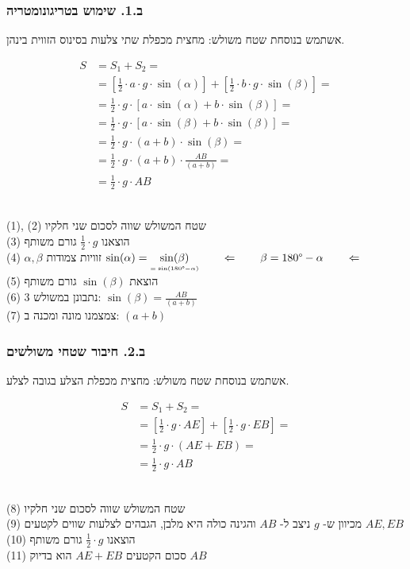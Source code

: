 \subsubsection*{ב.1. שימוש בטריגונומטריה}
אשתמש בנוסחת שטח משולש: מחצית מכפלת שתי צלעות בסינוס הזווית בינהן.
\\[-10pt]
\hspace*{90pt}
\parbox[t][130pt][t]{370pt}{
\begin{align}
S &= S_1 + S_2 = \\
&= [ \tfrac{1}{2} \cdot a \cdot g \cdot \sin(\alpha) ] + [ \tfrac{1}{2} \cdot b \cdot g \cdot \sin(\beta) ] = \\
&= \tfrac{1}{2} \cdot g \cdot [ a \cdot \sin(\alpha) + b \cdot \sin(\beta) ] = \\
&= \tfrac{1}{2} \cdot g \cdot [ a \cdot \sin(\beta) + b \cdot \sin(\beta) ] = \\
&= \tfrac{1}{2} \cdot g \cdot ( a + b ) \cdot \sin(\beta) = \\
&= \tfrac{1}{2} \cdot g \cdot ( a + b ) \cdot \tfrac{AB}{(a + b)} = \\
&= \tfrac{1}{2} \cdot g \cdot AB
\end{align}
}
\\[10pt]
(1), (2) שטח המשולש שווה לסכום שני חלקיו \\
(3) הוצאנו $\tfrac{1}{2} \cdot g$ גורם משותף \\
(4) $\alpha, \beta$ זוויות צמודות
$ \sin(\alpha) = \underset{\scriptscriptstyle{= \; \sin(180\degree - \alpha)}}{\sin(\beta)} \qquad \Leftarrow \qquad \beta = 180\degree - \alpha \qquad \Leftarrow \qquad $\\[-7pt]
(5) הוצאת $\sin(\beta)$ גורם משותף\\[2pt]
(6) נתבונן במשולש 3: $\sin(\beta) = \tfrac{AB}{(a + b)}$\\[2pt]
(7) צמצמנו מונה ומכנה ב: $(a + b)$
 
\subsubsection*{ב.2. חיבור שטחי משולשים}
אשתמש בנוסחת שטח משולש: מחצית מכפלת הצלע בגובה לצלע.
\\[-10pt]
\hspace*{100pt}
\parbox[t][80pt][t]{350pt}{
\begin{align}
S &= S_1 + S_2 = \\
&= [ \tfrac{1}{2} \cdot g \cdot AE ] + [ \tfrac{1}{2} \cdot g \cdot EB ] = \\
&= \tfrac{1}{2} \cdot g \cdot (AE + EB) = \\
&= \tfrac{1}{2} \cdot g \cdot AB
\end{align}
}
\\[10pt]
(8) שטח המשולש שווה לסכום שני חלקיו \\
(9) מכיוון ש- $g$ ניצב ל- $AB$ והגינה כולה היא מלבן, הגבהים לצלעות שווים לקטעים $AE, EB$ \\
(10) הוצאנו $\tfrac{1}{2} \cdot g$ גורם משותף \\
(11) סכום הקטעים $AE + EB$ הוא בדיוק $AB$

